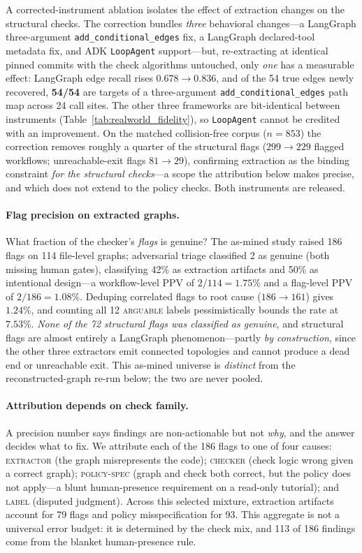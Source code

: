 A corrected-instrument ablation isolates the effect of extraction changes on
the structural checks. The correction bundles \emph{three} behavioral
changes---a LangGraph three-argument \texttt{add\_conditional\_edges} fix, a
LangGraph declared-tool metadata fix, and ADK \texttt{LoopAgent} support---but,
re-extracting at identical pinned commits with the check algorithms untouched,
only \emph{one} has a measurable effect: LangGraph edge recall rises
$0.678\rightarrow0.836$, and of the 54 true edges newly recovered,
\textbf{54/54} are targets of a three-argument \texttt{add\_conditional\_edges}
path map across 24 call sites. The other three frameworks are bit-identical
between instruments (Table~\ref{tab:realworld_fidelity}), so \texttt{LoopAgent}
cannot be credited with an improvement. On the matched collision-free corpus
($n{=}853$)
the correction removes roughly a quarter of the structural flags
($299\rightarrow229$ flagged workflows; unreachable-exit flags
$81\rightarrow29$), confirming extraction as the binding constraint \emph{for
the structural checks}---a scope the attribution below makes precise, and which
does not extend to the policy checks. Both instruments are released.

\paragraph{Flag precision on extracted graphs.}
What fraction of the checker's \emph{flags} is
genuine? The as-mined study raised 186 flags on 114 file-level graphs;
adversarial triage classified 2 as genuine (both missing human gates),
classifying 42\% as extraction artifacts and 50\% as intentional design---a
workflow-level PPV of $2/114 = 1.75\%$ and a flag-level PPV of
$2/186 = 1.08\%$. Deduping correlated flags to root cause
($186\rightarrow161$) gives $1.24\%$, and counting all 12 \textsc{arguable}
labels pessimistically bounds the rate at $7.53\%$.
\emph{None of the 72 structural flags was classified as genuine},
and structural flags are almost entirely a LangGraph
phenomenon---partly \emph{by construction}, since the other three extractors
emit connected topologies and cannot produce a dead end or unreachable exit.
This as-mined universe is \emph{distinct} from the reconstructed-graph re-run
below; the two are never pooled.

\paragraph{Attribution depends on check family.}
A precision number says findings are non-actionable but not \emph{why}, and the
answer decides what to fix. We attribute each of the 186 flags to one of four
causes: \textsc{extractor} (the graph misrepresents the code); \textsc{checker}
(check logic wrong given a correct graph); \textsc{policy-spec} (graph and check
both correct, but the policy does not apply---a blunt human-presence requirement
on a read-only tutorial); and \textsc{label} (disputed judgment). Across this
selected mixture, extraction artifacts account for 79 flags and policy
misspecification for 93. This aggregate is not a universal error budget: it is
determined by the check mix, and 113 of 186 findings come from the blanket
human-presence rule.

